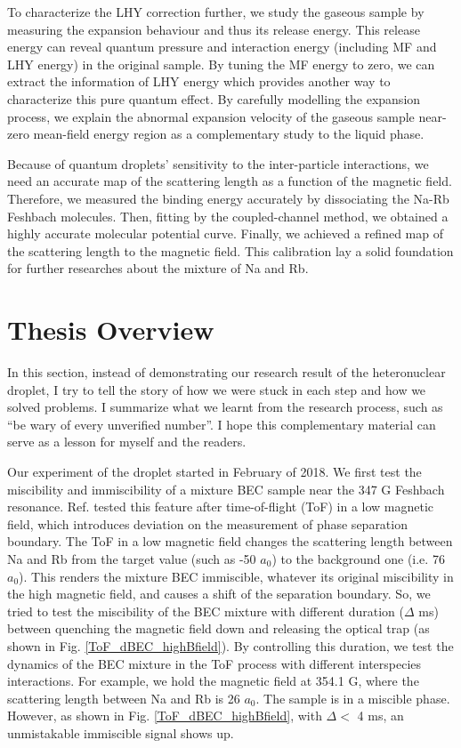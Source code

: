 To characterize the LHY correction further, we study the gaseous sample by measuring the expansion behaviour and thus its release energy. This release energy can reveal quantum pressure and interaction energy (including MF and LHY energy) in the original sample. By tuning the MF energy to zero, we can extract the information of LHY energy which provides another way to characterize this pure quantum effect. By carefully modelling the expansion process, we explain the abnormal expansion velocity of the gaseous sample near-zero mean-field energy region as a complementary study to the liquid phase.

Because of quantum droplets' sensitivity to the inter-particle interactions, we need an accurate map of the scattering length as a function of the magnetic field. Therefore, we measured the binding energy accurately by dissociating the Na-Rb Feshbach molecules. Then, fitting by the coupled-channel method, we obtained a highly accurate molecular potential curve. Finally, we achieved a refined map of the scattering length to the magnetic field. This calibration lay a solid foundation for further researches about the mixture of Na and Rb.

\section{Thesis Overview}
\label{sec:intro-overview}
In this section, instead of demonstrating our research result of the heteronuclear droplet, I try to tell the story of how we were stuck in each step and how we solved problems. I summarize what we learnt from the research process, such as ``be wary of every unverified number''. I hope this complementary material can serve as a lesson for myself and the readers.

Our experiment of the droplet started in February of 2018. We first test the miscibility and immiscibility of a mixture BEC sample near the 347 G Feshbach resonance. Ref. \cite{wang2015double} tested this feature after time-of-flight (ToF) in a low magnetic field, which introduces deviation on the measurement of phase separation boundary. The ToF in a low magnetic field changes the scattering length between Na and Rb from the target value (such as -50 \(a_0\)) to the background one (i.e. 76 \(a_0\)). This renders the mixture BEC immiscible, whatever its original miscibility in the high magnetic field, and causes a shift of the separation boundary. So, we tried to test the miscibility of the BEC mixture with different duration (\(\Delta\) ms) between quenching the magnetic field down and releasing the optical trap (as shown in Fig. \ref{ToF_dBEC_highBfield}). By controlling this duration, we test the dynamics of the BEC mixture in the ToF process with different interspecies interactions. For example, we hold the magnetic field at 354.1 G, where the scattering length between Na and Rb is 26 \(a_0\). The sample is in a miscible phase. However, as shown in Fig. \ref{ToF_dBEC_highBfield}, with \(\Delta<\) 4 ms, an unmistakable immiscible signal shows up.

